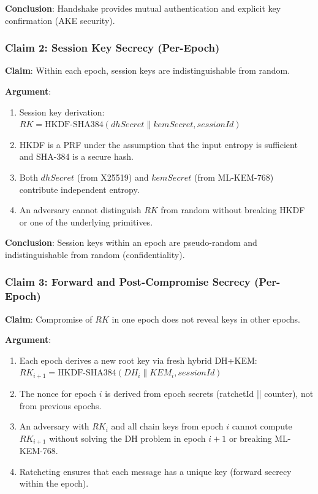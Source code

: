 \documentclass[11pt,a4paper,oneside]{article}
\begin{document}
\textbf{Conclusion}: Handshake provides mutual authentication and explicit key confirmation (AKE security).

\subsubsection{Claim 2: Session Key Secrecy (Per-Epoch)}

\textbf{Claim}: Within each epoch, session keys are indistinguishable from random.

\textbf{Argument}:
\begin{enumerate}
\item Session key derivation: $RK = \text{HKDF-SHA384}(dhSecret \| kemSecret, sessionId)$
\item HKDF is a PRF under the assumption that the input entropy is sufficient and SHA-384 is a secure hash.
\item Both $dhSecret$ (from X25519) and $kemSecret$ (from ML-KEM-768) contribute independent entropy.
\item An adversary cannot distinguish $RK$ from random without breaking HKDF or one of the underlying primitives.
\end{enumerate}

\textbf{Conclusion}: Session keys within an epoch are pseudo-random and indistinguishable from random (confidentiality).

\subsubsection{Claim 3: Forward and Post-Compromise Secrecy (Per-Epoch)}

\textbf{Claim}: Compromise of $RK$ in one epoch does not reveal keys in other epochs.

\textbf{Argument}:
\begin{enumerate}
\item Each epoch derives a new root key via fresh hybrid DH+KEM: $RK_{i+1} = \text{HKDF-SHA384}(DH_i \| KEM_i, sessionId)$
\item The nonce for epoch $i$ is derived from epoch secrets (ratchetId || counter), not from previous epochs.
\item An adversary with $RK_i$ and all chain keys from epoch $i$ cannot compute $RK_{i+1}$ without solving the DH problem in epoch $i+1$ or breaking ML-KEM-768.
\item Ratcheting ensures that each message has a unique key (forward secrecy within the epoch).
\end{enumerate}
\end{document}
